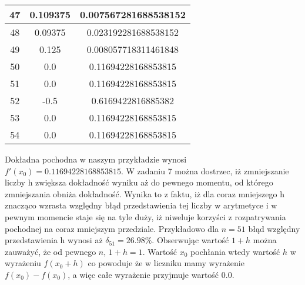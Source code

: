 \documentclass[12pt]{article}
\begin{document}
\begin{table}[]
\begin{tabular}{|c|c|c|}
\hline
47 & 0.109375 & 0.007567281688538152\\
\hline
48 & 0.09375 & 0.023192281688538152\\
\hline
49 & 0.125 & 0.008057718311461848\\
\hline
50 & 0.0 & 0.11694228168853815\\
\hline
51 & 0.0 & 0.11694228168853815\\
\hline
52 & -0.5 & 0.6169422816885382\\
\hline
53 & 0.0 & 0.11694228168853815\\
\hline
54 & 0.0 & 0.11694228168853815\\
\hline
    \end{tabular}
\end{table}

\newpage
Dokładna pochodna w naszym przykładzie wynosi \linebreak $f'(x_0) = 0.11694228168853815$.
W zadaniu 7 można dostrzec, iż zmniejszanie liczby h zwiększa dokładność wyniku aż do pewnego momentu, od którego zmniejszania obniża dokładność. Wynika to z faktu, iż dla coraz mniejszego h znacząco wzrasta względny błąd przedstawienia tej liczby w arytmetyce i w pewnym momencie staje się na tyle duży, iż niweluje korzyści z rozpatrywania pochodnej na coraz mniejszym przedziale. Przykładowo dla $n = 51$ błąd względny przedstawienia h wynosi aż $\delta_{51} = 26.98\% $. Obserwując wartość $1 + h$ można zauważyć, że od pewnego $n$,  $1 + h = 1$. Wartość $x_0$ pochłania wtedy wartość $h$ w wyrażeniu $f(x_0 + h)$ co powoduje że w liczniku mamy wyrażenie $f(x_0) - f(x_0)$, a więc całe wyrażenie przyjmuje wartość $0.0$.
\end{document}
